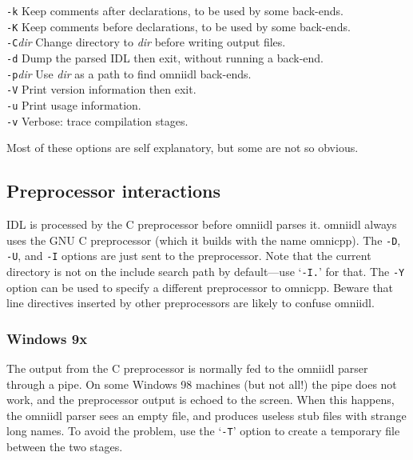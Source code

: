 \documentclass[11pt,oneside,a4paper]{book}
\newcommand{\cmdline}[1]{\texttt{#1}}
\begin{document}
\begin{tabbing}
\cmdline{-k}
     \> Keep comments after declarations, to be used by some back-ends.\\

\cmdline{-K}
     \> Keep comments before declarations, to be used by some back-ends.\\

\cmdline{-C}\textit{dir}
     \> Change directory to \textit{dir} before writing output files.\\

\cmdline{-d}
     \> Dump the parsed IDL then exit, without running a back-end.\\

\cmdline{-p}\textit{dir}
     \> Use \textit{dir} as a path to find omniidl back-ends.\\

\cmdline{-V}
     \> Print version information then exit.\\

\cmdline{-u}
     \> Print usage information.\\

\cmdline{-v}
     \> Verbose: trace compilation stages.\\

\end{tabbing}

\noindent Most of these options are self explanatory, but some are not
so obvious.

\subsection{Preprocessor interactions}

IDL is processed by the C preprocessor before omniidl parses it.
omniidl always uses the GNU C preprocessor (which it builds with the
name omnicpp). The \cmdline{-D}, \cmdline{-U}, and \cmdline{-I}
options are just sent to the preprocessor. Note that the current
directory is not on the include search path by default---use
`\cmdline{-I.}' for that. The \cmdline{-Y} option can be used to
specify a different preprocessor to omnicpp. Beware that line
directives inserted by other preprocessors are likely to confuse
omniidl.

\subsubsection{Windows 9x}

The output from the C preprocessor is normally fed to the omniidl
parser through a pipe. On some Windows 98 machines (but not all!)  the
pipe does not work, and the preprocessor output is echoed to the
screen. When this happens, the omniidl parser sees an empty file, and
produces useless stub files with strange long names. To avoid the
problem, use the `\cmdline{-T}' option to create a temporary file
between the two stages.
\end{document}
